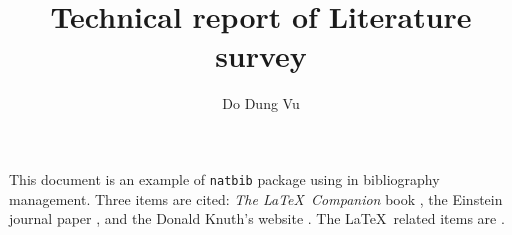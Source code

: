 \documentclass[a4paper,10pt]{article}
\title{Technical report of Literature survey}
\author{Do Dung Vu}
\begin{document}
\maketitle

This document is an example of \texttt{natbib} package using in bibliography management. Three items are cited: \textit{The \LaTeX\ Companion} book \cite{latexcompanion}, the Einstein journal paper \cite{einstein}, and the Donald Knuth's website \cite{knuthwebsite}. The \LaTeX\ related items are \cite{latexcompanion,knuthwebsite}. 

\medskip


\end{document}
